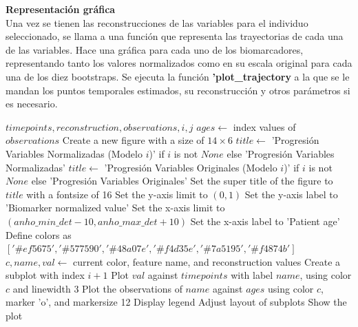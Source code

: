 \begin{description}
	 \item \textbf{Representación gráfica}\\	 
	 Una vez se tienen las reconstrucciones de las variables para el individuo seleccionado, se llama a una función que representa las trayectorias de cada una de las variables. Hace una gráfica para cada uno de los biomarcadores, representando tanto los valores normalizados como en su escala original para cada una de los diez bootstraps. Se ejecuta la función \textbf{'plot\_trajectory} a la que se le mandan los puntos temporales estimados, su reconstrucción y otros parámetros si es necesario.
	 
	 \begin{algorithm}
	 	\caption{plot\_trajectory}
	 	\begin{algorithmic}[1]
	 		\REQUIRE $timepoints, reconstruction, observations, i, j$
	 		\STATE $ages \leftarrow$ index values of $observations$
	 		\ENDIF
	 		\STATE Create a new figure with a size of $14 \times 6$
	 		\STATE $title \leftarrow$ 'Progresión Variables Normalizadas (Modelo $i$)' if $i$ is not $None$ else 'Progresión Variables Normalizadas'
	 		\STATE $title \leftarrow$ 'Progresión Variables Originales (Modelo $i$)' if $i$ is not $None$ else 'Progresión Variables Originales'
	 		\ENDIF
	 		\STATE Set the super title of the figure to $title$ with a fontsize of 16
	 		\STATE Set the y-axis limit to $(0, 1)$
	 		\STATE Set the y-axis label to 'Biomarker normalized value'
	 		\STATE Set the x-axis limit to $(anho\_min\_det - 10, anho\_max\_det + 10)$
	 		\STATE Set the x-axis label to 'Patient age'
	 		\STATE Define colors as $['\#ef5675', '\#577590', '\#48a07e', '\#f4d35e', '\#7a5195', '\#f4874b']$
	 		\STATE $c, name, val \leftarrow$ current color, feature name, and reconstruction values
	 		\STATE Create a subplot with index $i+1$
	 		\STATE Plot $val$ against $timepoints$ with label $name$, using color $c$ and linewidth 3
	 		\STATE Plot the observations of $name$ against $ages$ using color $c$, marker 'o', and markersize 12
	 		\ENDIF
	 		\STATE Display legend
	 		\ENDFOR
	 		\STATE Adjust layout of subplots
	 		\STATE Show the plot
	 	\end{algorithmic}
	 \end{algorithm}	 
	 
\end{description}

